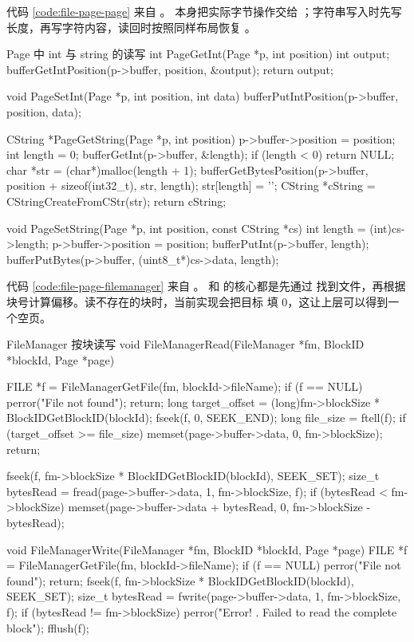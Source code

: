 代码 \ref{code:file-page-page} 来自 。 本身把实际字节操作交给 ；字符串写入时先写长度，再写字符内容，读回时按照同样布局恢复 。

\begin{dbcode}{Page 中 int 与 string 的读写}
int PageGetInt(Page *p, int position) {
    int output;
    bufferGetIntPosition(p->buffer, position, &output);
    return output;
}

void PageSetInt(Page *p, int position, int data) {
    bufferPutIntPosition(p->buffer, position, data);
}

CString *PageGetString(Page *p, int position) {
    p->buffer->position = position;
    int length = 0;
    bufferGetInt(p->buffer, &length);
    if (length < 0) {
        return NULL;
    }
    char *str = (char*)malloc(length + 1);
    bufferGetBytesPosition(p->buffer, position + sizeof(int32_t), str, length);
    str[length] = '\0';
    CString *cString = CStringCreateFromCStr(str);
    return cString;
}

void PageSetString(Page *p, int position, const CString *cs) {
    int length = (int)cs->length;
    p->buffer->position = position;
    bufferPutInt(p->buffer, length);
    bufferPutBytes(p->buffer, (uint8_t*)cs->data, length);
}
\end{dbcode}
\label{code:file-page-page}

代码 \ref{code:file-page-filemanager} 来自 。 和  的核心都是先通过  找到文件，再根据块号计算偏移。读不存在的块时，当前实现会把目标  填 0，这让上层可以得到一个空页。

\begin{dbcode}{FileManager 按块读写}
void FileManagerRead(FileManager *fm, BlockID *blockId, Page *page) {
    FILE *f = FileManagerGetFile(fm, blockId->fileName);
    if (f == NULL) {
        perror("File not found");
        return;
    }
    long target_offset = (long)fm->blockSize * BlockIDGetBlockID(blockId);
    fseek(f, 0, SEEK_END);
    long file_size = ftell(f);
    if (target_offset >= file_size) {
        memset(page->buffer->data, 0, fm->blockSize);
        return;
    }

    fseek(f, fm->blockSize * BlockIDGetBlockID(blockId), SEEK_SET);
    size_t bytesRead = fread(page->buffer->data, 1, fm->blockSize, f);
    if (bytesRead < fm->blockSize) {
        memset(page->buffer->data + bytesRead, 0,
               fm->blockSize - bytesRead);
    }
}

void FileManagerWrite(FileManager *fm, BlockID *blockId, Page *page) {
    FILE *f = FileManagerGetFile(fm, blockId->fileName);
    if (f == NULL) {
        perror("File not found");
        return;
    }
    fseek(f, fm->blockSize * BlockIDGetBlockID(blockId), SEEK_SET);
    size_t bytesRead = fwrite(page->buffer->data, 1, fm->blockSize, f);
    if (bytesRead != fm->blockSize) {
        perror("Error! . Failed to read the complete block");
    }
    fflush(f);
}
\end{dbcode}
\label{code:file-page-filemanager}

